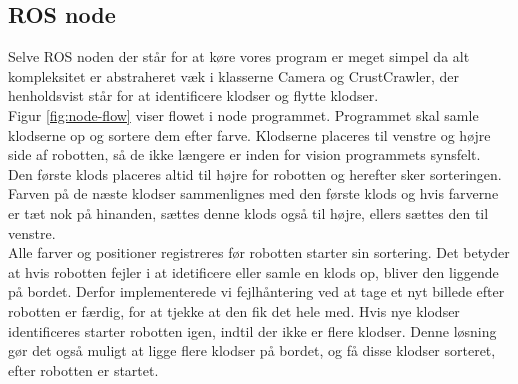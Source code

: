 \subsection{ROS node}
Selve ROS noden der står for at køre vores program er meget simpel da alt kompleksitet er abstraheret væk i klasserne Camera og CrustCrawler, der henholdsvist står for at identificere klodser og flytte klodser. \\

Figur \ref{fig:node-flow} viser flowet i node programmet.
Programmet skal samle klodserne op og sortere dem efter farve.
Klodserne placeres til venstre og højre side af robotten, så de ikke længere er inden for vision programmets synsfelt. \\

Den første klods placeres altid til højre for robotten og herefter sker sorteringen.
Farven på de næste klodser sammenlignes med den første klods og hvis farverne er tæt nok på hinanden, sættes denne klods også til højre, ellers sættes den til venstre. \\

Alle farver og positioner registreres før robotten starter sin sortering.
Det betyder at hvis robotten fejler i at idetificere eller samle en klods op, bliver den liggende på bordet.
Derfor implementerede vi fejlhåntering ved at tage et nyt billede efter robotten er færdig, for at tjekke at den fik det hele med.
Hvis nye klodser identificeres starter robotten igen, indtil der ikke er flere klodser.
Denne løsning gør det også muligt at ligge flere klodser på bordet, og få disse klodser sorteret, efter robotten er startet.

